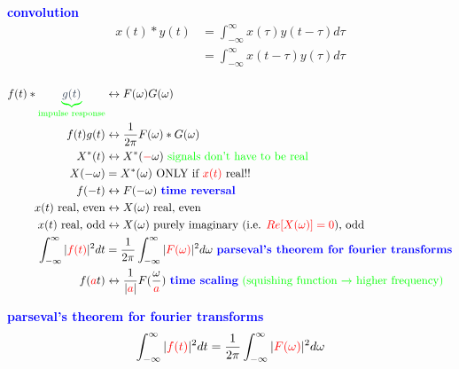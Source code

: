\documentclass[a5paper, fleqn]{article}
\newcommand{\vocab}[1]{\textbf{\textcolor{blue}{#1}}}
\newcommand{\emf}[1]{\textcolor{red}{#1}}
\newcommand{\note}[1]{\textcolor{green}{#1}}
\newcommand{\eq}[1]{\textcolor{red}{$#1$}}
\newcommand{\under}[2]{\textcolor{green}{\underbrace{\textcolor{secondary}{#1}}_\text{#2}}}
\begin{document}
\vocab{convolution}
\begin{align*}
  x(t) * y(t)
   & = \int_{-\infty}^\infty x(\tau) y(t - \tau) d\tau \\
   & = \int_{-\infty}^\infty x(t - \tau) y(\tau) d\tau \\
\end{align*}

\begin{align*}
  f(t) * \under{g(t)}{impulse response}   & \leftrightarrow F(\omega) G(\omega)                                                                                                            \\
  f(t) g(t)                               & \leftrightarrow \frac{1}{2\pi} F(\omega) * G(\omega)                                                                                           \\
  X^*(t)                                  & \leftrightarrow X^*(\emf{-}\omega) ~ \note{\text{signals don't have to be real}}                                                               \\
  X(-\omega)                              & = X^*(\omega) ~ \text{ONLY if \eq{x(t)} real!!}                                                                                                \\
  f(-t)                                   & \leftrightarrow F(-\omega) ~ \vocab{time reversal}                                                                                             \\
  x(t)\text{ real, even}                  & \leftrightarrow X(\omega)\text{ real, even}                                                                                                    \\
  x(t)\text{ real, odd}                   & \leftrightarrow X(\omega)\text{ purely imaginary (i.e. \eq{Re[X(\omega)] = 0}), odd}                                                           \\
  \int_{-\infty}^\infty |\emf{f(t)}|^2 dt & = \frac{1}{2\pi} \int_{-\infty}^\infty |\emf{F(\omega)}|^2 d\omega ~ \vocab{parseval's theorem for fourier transforms}                         \\
  f(\emf{a}t)                             & \leftrightarrow \frac{1}{|\emf{a}|} F(\frac{\omega}{\emf{a}}) ~ \text{\vocab{time scaling} \note{(squishing function $\to$ higher frequency)}}
\end{align*}

\vocab{parseval's theorem for fourier transforms}
\[\int_{-\infty}^\infty |\emf{f(t)}|^2 dt = \frac{1}{2\pi} \int_{-\infty}^\infty |\emf{F(\omega)}|^2 d\omega\]
\end{document}
